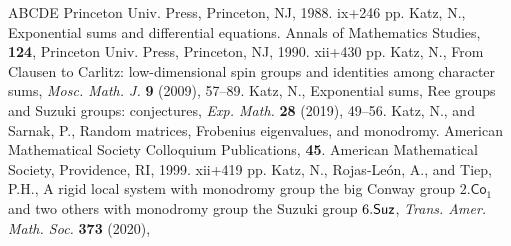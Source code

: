 \documentclass[11pt]{amsart}
\theoremstyle{plain}
\theoremstyle{definition}
\numberwithin{thm}{section}
\numberwithin{equation}{thm}
\newcommand{\A}{{\mathbb A}}
\newcommand{\0}{\emptyset}
\begin{document}
\begin{thebibliography}{ABCDE}
Princeton Univ. Press, Princeton, NJ, 1988. ix+246 pp.
\medskip
{}Katz, N., Exponential sums and 
differential equations. Annals of Mathematics Studies, {\bf 124}, Princeton Univ. Press, Princeton, NJ, 1990. xii+430 pp.
\medskip  
{}Katz, N., From Clausen to Carlitz: low-dimensional spin groups and identities among character sums, 
{\it Mosc. Math. J.} {\bf 9} (2009), 57--89.
\medskip
{}Katz, N., Exponential sums, Ree groups and Suzuki groups: conjectures, {\it  Exp. Math.} {\bf 28} (2019),  49--56.
\medskip
{}Katz, N., and Sarnak, P., Random matrices, Frobenius eigenvalues, and monodromy. American Mathematical Society Colloquium Publications, {\bf 45}. American Mathematical Society, Providence, RI, 1999. xii+419 pp.
\medskip
{}Katz, N., Rojas-Le\'{o}n, A., and Tiep, P.H., A rigid local system with monodromy group the big Conway group 
$2.{\mathsf {Co}}_1$ and two others  with monodromy group the Suzuki group $6.{\sf{Suz}}$, {\it Trans. Amer. Math. Soc.} {\bf 373} (2020), 

\end{thebibliography}
\end{document}
